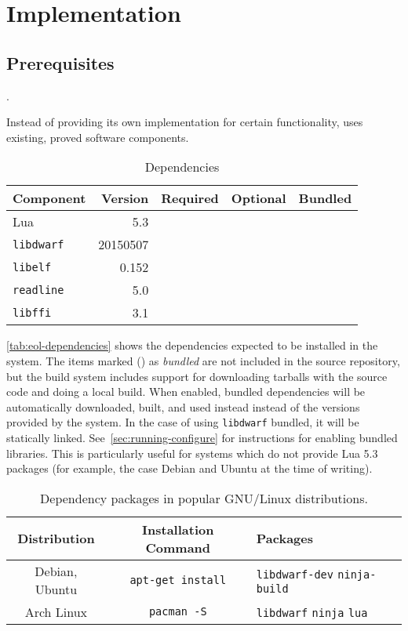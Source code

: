 
\chapter{Implementation}

\section{Prerequisites}

.

Instead of providing its own implementation for certain functionality, \Eol*
uses existing, proved software components.

\begin{table}[h]
	\centering
	\begin{tabular}{lrccc}
		\toprule
		Component & Version  & Required & Optional & Bundled \\
		\midrule
		Lua             & 5.3      & \Tick &       & \Tick \\
		\verb|libdwarf| & 20150507 & \Tick &       & \Tick \\
		\verb|libelf|   & 0.152    & \Tick &       & \\
		\verb|readline| & 5.0      &       & \Tick & \\
		\verb|libffi|   & 3.1      & \Tick &       & \\
		\bottomrule
	\end{tabular}
	\caption{Dependencies}
	\label{tab:eol-dependencies}
\end{table}

\autoref{tab:eol-dependencies} shows the dependencies expected to be
installed in the system. The items marked (\inlinesymbol\Tick) as
\emph{bundled} are not included in the source repository, but the build system
includes support for downloading tarballs with the source code and doing
a local build. When enabled, bundled dependencies will be automatically
downloaded, built, and used instead instead of the versions provided by the
system. In the case of using \verb|libdwarf| bundled, it will be statically
linked. See~\autoref{sec:running-configure} for instructions for enabling
bundled libraries. This is particularly useful for systems which do not
provide Lua 5.3 packages (for example, the case Debian and Ubuntu at the time
of writing).

\begin{table}
  \begin{tabular}{ccp{}}
  \toprule
	Distribution & Installation Command & Packages \\
	\midrule
	Debian, Ubuntu &
    \verb|apt-get install| &
    \verb|libdwarf-dev| \verb|ninja-build| \\
	Arch Linux & \verb|pacman -S| & \verb|libdwarf| \verb|ninja| \verb|lua| \\
	\bottomrule
  \end{tabular}
  \caption{Dependency packages in popular GNU/Linux distributions.}
  \label{tab:distro-dependency-packages}
\end{table}

